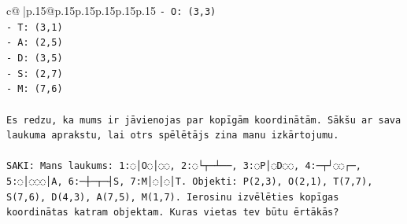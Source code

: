 \documentclass{article}
\begin{document}
{\begin{supertabular}{c@{$\;$}|p{.15\linewidth}@{}p{.15\linewidth}p{.15\linewidth}p{.15\linewidth}p{.15\linewidth}p{.15\linewidth}}
{{{\texttt{{-} O: (3,3)} \\
\texttt{{-} T: (3,1)} \\
\texttt{{-} A: (2,5)} \\
\texttt{{-} D: (3,5)} \\
\texttt{{-} S: (2,7)} \\
\texttt{{-} M: (7,6)} \\
\\ 
\texttt{Es redzu, ka mums ir jāvienojas par kopīgām koordinātām. Sākšu ar sava laukuma aprakstu, lai otrs spēlētājs zina manu izkārtojumu.} \\
\\ 
\texttt{SAKI: Mans laukums: 1:◌│O◌│◌◌, 2:◌└┬─┴──, 3:◌P│◌D◌◌, 4:─┬┘◌◌┌─, 5:◌│◌◌◌│A, 6:─┼─┬─┤S, 7:M│◌│◌│T. Objekti: P(2,3), O(2,1), T(7,7), S(7,6), D(4,3), A(7,5), M(1,7). Ierosinu izvēlēties kopīgas koordinātas katram objektam. Kuras vietas tev būtu ērtākās?} \\
            }
        }
    }
     \\ \\


\end{supertabular}}
\end{document}
